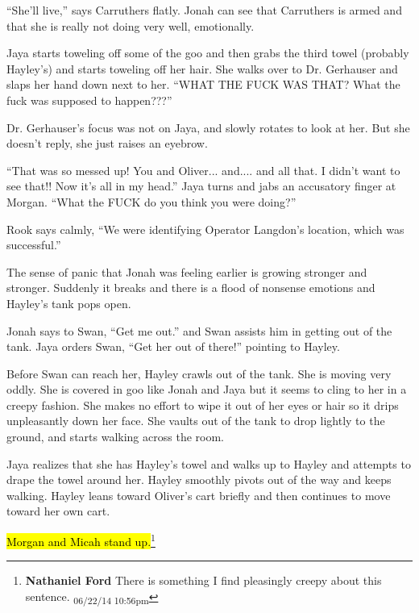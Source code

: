 ``She'll live,'' says Carruthers flatly.   Jonah can see that Carruthers is armed and that she is really not doing very well, emotionally.



Jaya starts toweling off some of the goo and then grabs the third towel (probably Hayley's) and starts toweling off her hair.  She walks over to Dr. Gerhauser and slaps her hand down next to her.  ``WHAT THE FUCK WAS THAT?  What the fuck was supposed to happen???''

Dr. Gerhauser's focus was not on Jaya, and slowly rotates to look at her. But she doesn't reply, she just raises an eyebrow.

``That was so messed up!  You and Oliver... and.... and all that.  I didn't want to see that!!  Now it's all in my head.''  Jaya turns and jabs an accusatory finger at Morgan.   ``What the FUCK do you think you were doing?''



Rook says calmly, ``We were identifying Operator Langdon's location, which was successful.''



The sense of panic that Jonah was feeling earlier is growing stronger and stronger.  Suddenly it breaks and there is a flood of nonsense emotions and Hayley's tank pops open.



Jonah says to Swan, ``Get me out.'' and Swan assists him in getting out of the tank.  Jaya orders Swan, ``Get her out of there!'' pointing to Hayley.



Before Swan can reach her, Hayley crawls out of the tank.  She is moving very oddly.  She is covered in goo like Jonah and Jaya but it seems to cling to her in a creepy fashion.  She makes no effort to wipe it out of her eyes or hair so it drips unpleasantly down her face.  She vaults out of the tank to drop lightly to the ground, and starts walking across the room.



Jaya realizes that she has Hayley's towel and walks up to Hayley and attempts to drape the towel around her.  Hayley smoothly pivots out of the way and keeps walking.  Hayley leans toward Oliver's cart briefly and then continues to move toward her own cart.



\hl{Morgan and Micah stand up.}\footnote{\textbf{Nathaniel Ford }There is something I find pleasingly creepy about this sentence. \textsubscript{06/22/14 10:56pm}}  




